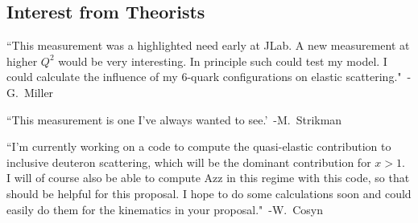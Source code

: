 \subsection{Interest from Theorists}

``This measurement was a highlighted need early at JLab. A new measurement at higher $Q^2$ would be very interesting. In principle such could test my model. I could calculate the influence of my 6-quark configurations on elastic scattering."~-G.~Miller

``This measurement is one I've always wanted to see.'~-M.~Strikman

``I'm currently working on a code to compute the quasi-elastic  contribution to inclusive deuteron scattering, which will be the dominant contribution for $x > 1$.  I will of course also be able to compute Azz in this regime with this 
code, so that should be helpful for this proposal. I hope to do some 
calculations soon and could easily do them for the kinematics in your 
proposal."~-W.~Cosyn